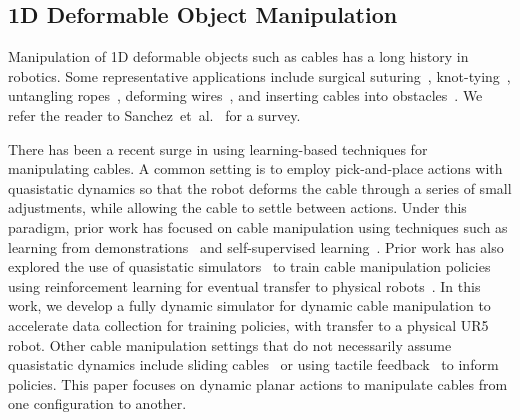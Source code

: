 \documentclass[letterpaper, 10 pt, conference]{ieeeconf}  %
\begin{document}
\subsection{1D Deformable Object Manipulation}

Manipulation of 1D deformable objects such as cables has a long history in robotics. Some representative applications include surgical suturing~\cite{robot_heart_surgery_2006,suturing_autolab_2016, zhang2016health, zhang2021robots, zhang2020dex}, knot-tying~\cite{van_den_berg_2010,case_study_knots_1991,knot_planning_2003,tying_precisely_2016, sim2019personalization, elmquist2022art, avigal20206, avigal2021avplug, devgon2020orienting}, untangling ropes~\cite{rope_untangling_2013,grannen2020untangling,tactile_cable_2020, lim2021planar, lim2022real2sim2real}, deforming wires~\cite{wire_insertion_1997}, and inserting cables into obstacles~\cite{tight_tolerance_insertion_2015}. We refer the reader to Sanchez~et~al.~\cite{manip_deformable_survey_2018} for a survey. %

There has been a recent surge in using learning-based techniques for manipulating cables. A common setting is to employ pick-and-place actions with quasistatic dynamics so that the robot deforms the cable through a series of small adjustments, while allowing the cable to settle between actions. Under this paradigm, prior work has focused on cable manipulation using techniques such as learning from demonstrations~\cite{zeng_transporters_2020,seita_bags_2021, eisner2022flowbot3d, pan2022tax, pan2023tax, zhang2023flowbot++} and self-supervised learning~\cite{nair_rope_2017,ZSVI_2018}.
Prior work has also explored the use of quasistatic simulators~\cite{corl2020softgym} to train cable manipulation policies using reinforcement learning for eventual transfer to physical robots~\cite{lerrel_2020,yan_fabrics_latent_2020, yao2023apla, shen2024diffclip, jin2024multi}. In this work, we develop a fully dynamic simulator for dynamic cable manipulation to accelerate data collection for training policies, with transfer to a physical UR5 robot.
Other cable manipulation settings that do not necessarily assume quasistatic dynamics include sliding cables~\cite{one_hand_knotting_tactile_2007,zhu_sliding_cables_2019} or using tactile feedback~\cite{tactile_cable_2020} to inform policies. This paper focuses on dynamic planar actions to manipulate cables from one configuration to another.
\end{document}
